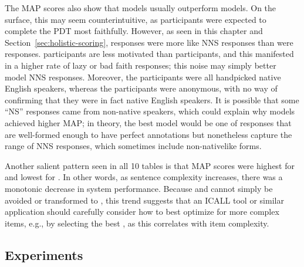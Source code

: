 The MAP scores also show that  models usually outperform  models. On the surface, this may seem counterintuitive, as  participants were expected to complete the PDT most faithfully. However, as seen in this chapter and Section~\ref{sec:holistic-scoring},  responses were more like NNS responses than were  responses.  participants are less motivated than  participants, and this manifested in a higher rate of lazy or bad faith responses; this noise may simply better model NNS responses. Moreover, the  participants were all handpicked native English speakers, whereas the  participants were anonymous, with no way of confirming that they were in fact native English speakers. It is possible that some ``NS'' responses came from non-native speakers, which could explain why  models achieved higher MAP; in theory, the best model would be one of responses that are well-formed enough to have perfect annotations but nonetheless capture the range of NNS responses, which sometimes include non-nativelike forms.

Another salient pattern seen in all 10 tables is that MAP scores were highest for  and lowest for . In other words, as sentence complexity increases, there was a monotonic decrease in system performance. Because  and  cannot simply be avoided or transformed to , this trend suggests that an ICALL tool or similar application should carefully consider how to best optimize for more complex items, e.g., by selecting the best , as this correlates with item complexity.

\subsection{ Experiments}
\label{sec:map-core}

